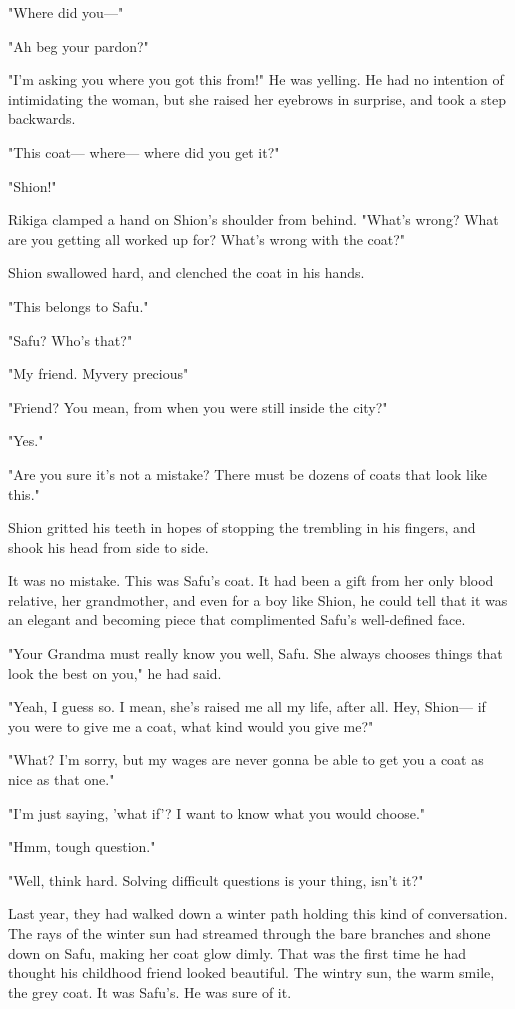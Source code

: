 "Where did you---"

"Ah beg your pardon?"

"I'm asking you where you got this from!" He was yelling. He had no
intention of intimidating the woman, but she raised her eyebrows in
surprise, and took a step backwards.

"This coat--- where--- where did you get it?"

"Shion!"

Rikiga clamped a hand on Shion's shoulder from behind. "What's wrong?
What are you getting all worked up for? What's wrong with the coat?"

Shion swallowed hard, and clenched the coat in his hands.

"This belongs to Safu."

"Safu? Who's that?"

"My friend. My\el very precious\el "

"Friend? You mean, from when you were still inside the city?"

"Yes."

"Are you sure it's not a mistake? There must be dozens of coats that
look like this."

Shion gritted his teeth in hopes of stopping the trembling in his
fingers, and shook his head from side to side.

It was no mistake. This was Safu's coat. It had been a gift from her
only blood relative, her grandmother, and even for a boy like Shion, he
could tell that it was an elegant and becoming piece that complimented
Safu's well-defined face.

"Your Grandma must really know you well, Safu. She always chooses things
that look the best on you," he had said.

"Yeah, I guess so. I mean, she's raised me all my life, after all. Hey,
Shion--- if you were to give me a coat, what kind would you give me?"

"What? I'm sorry, but my wages are never gonna be able to get you a coat
as nice as that one."

"I'm just saying, 'what if'? I want to know what you would choose."

"Hmm, tough question."

"Well, think hard. Solving difficult questions is your thing, isn't it?"

Last year, they had walked down a winter path holding this kind of
conversation. The rays of the winter sun had streamed through the bare
branches and shone down on Safu, making her coat glow dimly. That was
the first time he had thought his childhood friend looked beautiful. The
wintry sun, the warm smile, the grey coat. It was Safu's. He was sure of
it.

